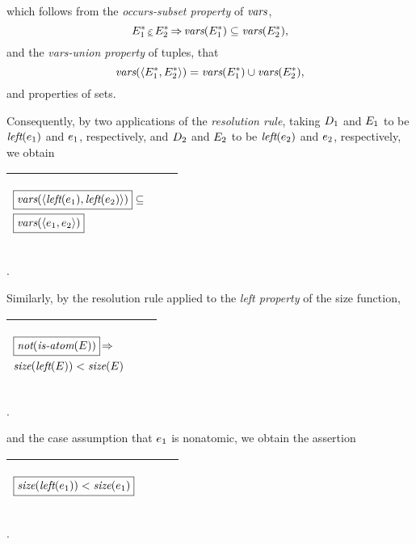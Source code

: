 \documentclass[runningheads]{llncs}
\DeclareMathOperator{\unot}{\emph{not}\kern-.0pt}
\DeclareMathOperator{\uimplies}{\Rightarrow}
\DeclareMathOperator{\isatm}{\emph{is-atom}}
\DeclareMathOperator{\lef}{\emph{left}}
\begin{document}
\noindent 
which follows from the \emph{occurs-subset property} of $\emph{vars}$,
\[E_{1}^* \occurseq E_{2}^* \uimplies \vars(E_{1}^*) \subseteq \vars(E_{2}^*),\]
and the \emph{vars-union property} of tuples, that
\[\emph{vars}(\langle E_{1}^*, E_{2}^*\rangle) =
\emph{vars}(E_{1}^*) \cup \emph{vars}(E_{2}^*),\]
and properties of sets. 

Consequently, by two applications of the \emph{resolution rule}, taking ${D}_{1}$ and ${E}_{1}$ to be $\lef(\e{1})$ and $e_{1}$, respectively, and ${D}_{2}$ 
and ${E}_{2}$ to be  $\lef(\e{2})$ and $e_{2}$, respectively, we obtain

\vspace{5pt}
\noindent \begin{tabular}{|m{}|m{}||m{}|}
\hline
\begin{center}$
\begin{aligned}
       & \boxed{\vars(\langle \lef(\e{1}), \lef(\e{2}) \rangle)} \subseteq \\
      &\boxed{\vars(\langle \e{1}, \e{2} \rangle)}
    \end{aligned}
$
\end{center}& &  \\  \hline
\end{tabular}.

 \vspace{10pt}
Similarly, by the resolution rule applied to 
the \emph{left property} of the size function, 
\begin{center}
  \begin{tabular}{|m{}|m{}||m{}|}
\hline
\begin{center}
$
\begin{aligned}
    &\boxed{\unot(\isatm(E))} \uimplies \\
    & \size(\lef(E)) < \size(E)
    \end{aligned}
$
\end{center}
& &  \\  \hline
\end{tabular}.
\end{center}
\vspace{5pt}
and the case assumption that $e_{1}$ is nonatomic, we obtain the assertion 
\begin{center}
  \begin{tabular}{|m{}|m{}||m{}|}
\hline
\begin{center}
$
\begin{aligned}
    & \boxed{\size(\lef(\e{1})) < \size(\e{1})}
    \end{aligned}
$
\end{center}
& &  \\  \hline
\end{tabular}.
\end{center}
\end{document}
